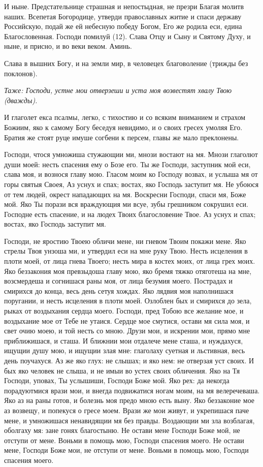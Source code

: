 И ныне. Предстательнице страшная и непостыдная, не презри Благая молитв наших. Всепетая Богородице, утверди православных житие и спаси державу Российскую, подай же ей небесную победу Богом, Его же родила еси, едина Благословенная. Господи помилуй (12). Слава Отцу и Сыну и Святому Духу, и ныне, и присно, и во веки веком. Аминь.

Слава в вышних Богу, и на земли мир, в человецех благоволение (трижды без поклонов).


\itshape Таже:\normalfont{} Господи, устне мои отверзеши и уста моя возвестят хвалу Твою (дважды). 

И глаголет екса псалмы, легко, с тихостию и со всяким вниманием и страхом Божиим, яко к самому Богу беседуя невидимо, и о своих гресех умоляя Его. Братия же стоят руце имуше согбени к персем, главы же мало преклонены.




Господи, чтося умножиша стужающии ми, мнози востают на мя. Мнози глаголют души моей: несть спасения ему о Бозе его. Ты же Господи, заступник мой еси, слава моя, и вознося главу мою. Гласом моим ко Господу возвах, и услыша мя от горы святыя Своея, Аз уснух и спах; востах, яко Господь заступит мя. Не убоюся от тем людей, окрест нападающих на мя. Воскресни Господи, спаси мя, Боже мой. Яко Ты порази вся враждующия ми всуе, зубы грешником сокрушил еси. Господне есть спасение, и на людех Твоих благословение Твое. Аз уснух и спах; востах, яко Господь заступит мя.




Господи, не яростию Твоею обличи мене, ни гневом Твоим покажи мене. Яко стрелы Твоя унзоша ми, и утвердил еси на мне руку Твою. Несть исцеления в плоти моей, от лица гнева Твоего; несть мира в костех моих, от лица грех моих. Яко беззакония моя превзыдоша главу мою, яко бремя тяжко отяготеша на мне, возсмердеша и согнишася раны моя, от лица безумия моего. Пострадах и смирихся до конца, весь день сетуя хождах. Яко лядвия моя наполнишася поругании, и несть исцеления в плоти моей. Озлоблен бых и смирихся до зела, рыках от воздыхания сердца моего. Господи, пред Тобою все желание мое, и воздыхание мое от Тебе не утаися. Сердце мое смутися, остави мя сила моя, и свет очию моею, и той несть со мною. Друзи мои, и искрении мои, прямо мне приближишася, и сташа. И ближнии мои отдалече мене сташа, и нуждахуся, ищущии душу мою, и ищущии злая мне: глаголаху суетная и льстивная, весь день поучахуся. Аз же яко глух: не слышах; и яко нем: не отверзая уст своих. И бых яко человек не слыша, и не имыи во устех своих обличения. Яко на Тя Господи, уповах, Ты услышиши, Господи Боже мой. Яко рех: да некогда порадуютмися врази мои, и внегда подвижатися ногам моим, на мя велеречеваша. Яко аз на раны готов, и болезнь моя предо мною есть выну. Яко беззаконие мое аз возвещу, и попекуся о гресе моем. Врази же мои живут, и укрепишася паче мене, и умножишася ненавидящии мя без правды. Воздающии ми зла возблагая, оболгаху мя: зане гонях благостыню. Не остави мене Господи Боже мой, не отступи от мене. Воньми в помощь мою, Господи спасения моего. Не остави мене, Господи Боже мои, не отступи от мене. Воньми в помощь мою, Господи спасения моего.

